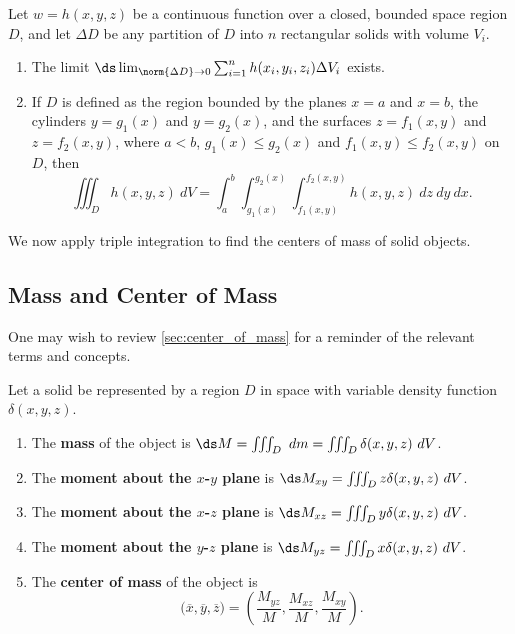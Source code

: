 \begin{theorem}\label{thm:triple_integration2}
Let $w=h(x,y,z)$ be a continuous function over a closed, bounded space region $D$, and let $\Delta D$ be any partition of $D$ into $n$ rectangular solids with volume $V_i$.

\begin{enumerate}
\item		The limit $\ds \lim_{\norm{\Delta D}\to 0}\sum_{i=1}^n h(x_i,y_i,z_i)\Delta V_i$ exists.

\item		If $D$ is defined as the region bounded by the planes $x=a$ and $x=b$, the cylinders $y=g_1(x)$ and $y=g_2(x)$, and the surfaces $z=f_1(x,y)$ and $z=f_2(x,y)$, where $a<b$, $g_1(x)\leq g_2(x)$ and $f_1(x,y)\leq f_2(x,y)$ on $D$, then
	\[\iiint_D h(x,y,z)\ dV = \int_a^b\int_{g_1(x)}^{g_2(x)}\int_{f_1(x,y)}^{f_2(x,y)} h(x,y,z)\ dz\ dy\ dx.\]
\end{enumerate}
\end{theorem}

We now apply triple integration to find the centers of mass of solid objects.

\subsection{Mass and Center of Mass}

One may wish to review \autoref{sec:center_of_mass} for a reminder of the relevant terms and concepts. 

\begin{definition}\label{def:mass_3d}
Let a solid be represented by a region $D$ in space with variable density function $\delta(x,y,z)$. 
\begin{enumerate}
	\item The \textbf{mass} of the object is $\ds M= \iiint_D \ dm=\iiint_D \delta(x,y,z)\ dV$.
	\item	The \textbf{moment about the $x$-$y$ plane} is $\ds M_{xy}=\iiint_D z\delta(x,y,z)\ dV$.
	\item	The \textbf{moment about the $x$-$z$ plane} is $\ds M_{xz}=\iiint_D y\delta(x,y,z)\ dV$.
	\item	The \textbf{moment about the $y$-$z$ plane} is $\ds M_{yz}=\iiint_D x\delta(x,y,z)\ dV$.
	\item The \textbf{center of mass} of the object is
	\[\big(\overline{x},\overline{y},\overline{z}\big) = \left(\frac{M_{yz}}M,\frac{M_{xz}}M,\frac{M_{xy}}M\right).\]
\end{enumerate}
\end{definition}

